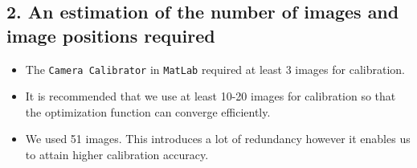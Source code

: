 \subsection*{2. An estimation of the number of images and image positions required}
\begin{itemize}
\item The \texttt{Camera Calibrator} in \texttt{MatLab} required at least 3 images for calibration.
\item It is recommended that we use at least 10-20 images for calibration so that the optimization function can converge efficiently.
\item We used 51 images. This introduces a lot of redundancy however it enables us to attain higher calibration accuracy.
\end{itemize}

